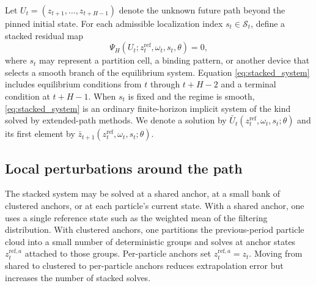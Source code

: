 \documentclass[11pt]{article}
\theoremstyle{remark}
\begin{document}
Let $U_t=(z_{t+1},\ldots,z_{t+H-1})$ denote the unknown future path beyond the pinned initial state.
For each admissible localization index $s_t\in\mathcal{S}_t$, define a stacked residual map
\begin{equation}
\Psi_H(U_t; z_t^{\mathrm{ref}},\omega_t,s_t,\theta)=0,
\label{eq:stacked_system}
\end{equation}
where $s_t$ may represent a partition cell, a binding pattern, or another device that selects a smooth branch of the equilibrium system.
Equation \eqref{eq:stacked_system} includes equilibrium conditions from $t$ through $t+H-2$ and a terminal condition at $t+H-1$.
When $s_t$ is fixed and the regime is smooth, \eqref{eq:stacked_system} is an ordinary finite-horizon implicit system of the kind solved by extended-path methods.
We denote a solution by $\bar U_t(z_t^{\mathrm{ref}},\omega_t,s_t;\theta)$ and its first element by $\bar z_{t+1}(z_t^{\mathrm{ref}},\omega_t,s_t;\theta)$.

\subsection{Local perturbations around the path}

The stacked system may be solved at a shared anchor, at a small bank of clustered anchors, or at each particle's current state.
With a shared anchor, one uses a single reference state such as the weighted mean of the filtering distribution.
With clustered anchors, one partitions the previous-period particle cloud into a small number of deterministic groups and solves at anchor states $z_t^{\mathrm{ref},a}$ attached to those groups.
Per-particle anchors set $z_t^{\mathrm{ref},a}=z_t$.
Moving from shared to clustered to per-particle anchors reduces extrapolation error but increases the number of stacked solves.
\end{document}
